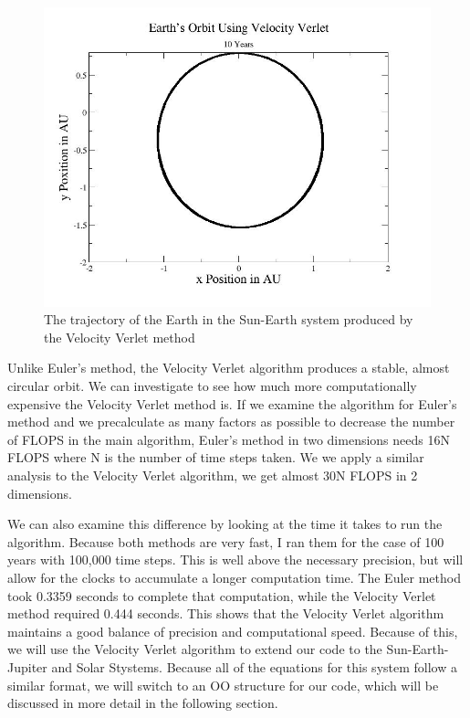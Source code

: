\documentclass[%
oneside,                 %
final,                   %
10pt]{article}
\begin{document}
\begin{figure}[H]\label{fig:velrplot}
  \centering
    \includegraphics[width=1.0\textwidth]{velverearth.jpg}
    \caption{The trajectory of the Earth in the Sun-Earth system produced by the Velocity Verlet method}
\end{figure}

Unlike Euler's method, the Velocity Verlet algorithm produces a stable, almost circular orbit.  We can investigate to see how much more computationally expensive the Velocity Verlet method is.  If we examine the algorithm for Euler's method and we precalculate as many factors as possible to decrease the number of FLOPS in the main algorithm, Euler's method in two dimensions needs 16N FLOPS where N is the number of time steps taken.  We we apply a similar analysis to the Velocity Verlet algorithm, we get almost 30N FLOPS in 2 dimensions.  

We can also examine this difference by looking at the time it takes to run the algorithm.  Because both methods are very fast, I ran them for the case of 100 years with 100,000 time steps.  This is well above the necessary precision, but will allow for the clocks to accumulate a longer computation time.  The Euler method took 0.3359 seconds to complete that computation, while the Velocity Verlet method required 0.444 seconds.  This shows that the Velocity Verlet algorithm maintains a good balance of precision and computational speed.  Because of this, we will use the Velocity Verlet algorithm to extend our code to the Sun-Earth-Jupiter and Solar Stystems.  Because all of the equations for this system follow a similar format, we will switch to an OO structure for our code, which will be discussed in more detail in the following section. 
\end{document}

